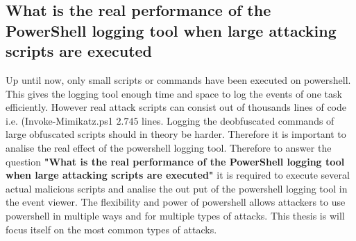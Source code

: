 \documentclass{article}%
\begin{document}
\subsection{What is the real performance of the PowerShell logging tool when large attacking scripts are executed}
Up until now, only small scripts or commands have been executed on powershell. This gives the logging tool enough time and space to log the events of one task efficiently. However real attack scripts can consist out of thousands lines of code i.e. (Invoke-Mimikatz.ps1 $2.745$ lines. Logging the deobfuscated commands of large obfuscated scripts should in theory be harder. Therefore it is important to analise the real effect of the powershell logging tool. Therefore to answer the question \textbf{"What is the real performance of the PowerShell logging tool when large attacking scripts are executed"} it is required to execute several actual malicious scripts and analise the out put of the powershell logging tool in the event viewer.
\newline
The flexibility and power of powershell allows attackers to use powershell in multiple ways and for multiple types of attacks. This thesis is will focus itself on the most common types of attacks.
\newline
\end{document}
